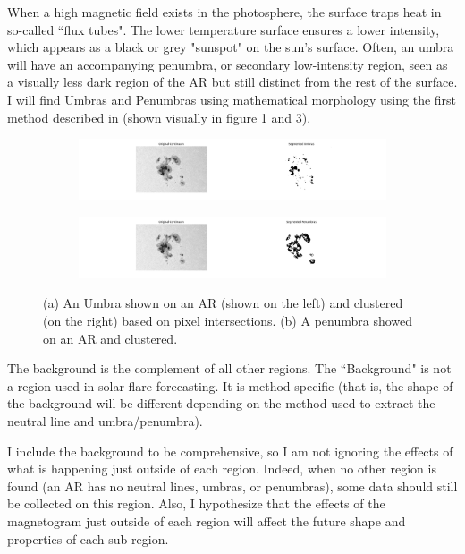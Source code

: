 When a high magnetic field exists in the photosphere, the surface traps heat in so-called ``flux tubes". The lower temperature surface ensures a lower intensity, which appears as a black or grey "sunspot" on the sun's surface. Often, an umbra will have an accompanying penumbra, or secondary low-intensity region, seen as a visually less dark region of the AR but still distinct from the rest of the surface. I will find Umbras and Penumbras using mathematical morphology using the first method described in \cite{comparisonofumpenmethod} (shown visually in figure \ref{fig:umbra} and \ref{fig:penumbra}).
\begin{figure}[h]
\centering
\begin{subfigure}[b]{0.8\textwidth}
   \includegraphics[width=\linewidth]{ThesisFilePkg/figures/data/umbras.png}
   \caption{}
   \label{fig:umbra} 
\end{subfigure}
\begin{subfigure}[b]{0.8\textwidth}
   \includegraphics[width=\linewidth]{ThesisFilePkg/figures/data/penumbras.png}
   \caption{}
   \label{fig:penumbra}
\end{subfigure}
\caption[Umbra and Penumbra]{(a) An Umbra shown on an AR (shown on the left) and clustered (on the right) based on pixel intersections. (b) A penumbra showed on an AR and clustered.}
\end{figure}

The background is the complement of all other regions. The ``Background" is not a region used in solar flare forecasting. It is method-specific (that is, the shape of the background will be different depending on the method used to extract the neutral line and umbra/penumbra). 

I include the background to be comprehensive, so I am not ignoring the effects of what is happening just outside of each region. Indeed, when no other region is found (an AR has no neutral lines, umbras, or penumbras), some data should still be collected on this region. Also, I hypothesize that the effects of the magnetogram just outside of each region will affect the future shape and properties of each sub-region.

